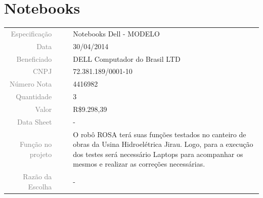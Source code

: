 




\section{Notebooks}
\label{notebook}


\begin{table}[ht!]

	\begin{tabular}{r l|l p{12cm} }
		
		\textcolor{gray}{Especificação} &&& 	{Notebooks Dell - MODELO}\\
		\textcolor{gray}{Data} &&& 				{30/04/2014}\\
        \textcolor{gray}{Beneficiado} &&&		{DELL Computador do Brasil LTD} \\
        \textcolor{gray}{CNPJ} &&& 				{72.381.189/0001-10} \\
        \textcolor{gray}{Número Nota} &&& 		{4416982} \\
		\textcolor{gray}{Quantidade} &&& 		{3} \\
		\textcolor{gray}{Valor} &&& 			{R\$9.298,39} \\
		\textcolor{gray}{Data Sheet} &&& 		{-} \\

		\textcolor{gray}{Função no projeto} &&& {O robô ROSA terá suas funções testados no canteiro de obras da Usina Hidroelétrica Jirau. Logo, para a execução dos testes será necessário Laptops para acompanhar os mesmos e realizar as correções necessárias.  } \\
		\textcolor{gray}{Razão da Escolha} &&& {-}

	\end{tabular}
\end{table}

\newpage

